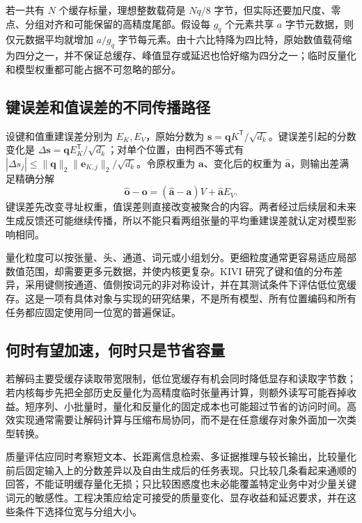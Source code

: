 \documentclass[UTF8,12pt,a4paper,fontset=fandol]{ctexart}
\begin{document}
若一共有 $N$ 个缓存标量，理想整数载荷是 $Nq/8$ 字节，但实际还要加尺度、零点、分组对齐和可能保留的高精度尾部。假设每 $g_q$ 个元素共享 $a$ 字节元数据，则仅元数据平均就增加 $a/g_q$ 字节每元素。由十六比特降为四比特，原始数值载荷缩为四分之一，并不保证总缓存、峰值显存或延迟也恰好缩为四分之一；临时反量化和模型权重都可能占据不可忽略的部分。

\subsection{键误差和值误差的不同传播路径}

设键和值重建误差分别为 $E_K,E_V$，原始分数为 $\mathbf s=\mathbf qK^{\mathsf T}/\sqrt{d_k}$。键误差引起的分数变化是 $\Delta\mathbf s=\mathbf qE_K^{\mathsf T}/\sqrt{d_k}$；对单个位置，由柯西不等式有 $|\Delta s_j|\leq\|\mathbf q\|_2\|\mathbf e_{K,j}\|_2/\sqrt{d_k}$。令原权重为 $\mathbf a$、变化后的权重为 $\widehat{\mathbf a}$，则输出差满足精确分解
\begin{equation}
 \widehat{\mathbf o}-\mathbf o
 =(\widehat{\mathbf a}-\mathbf a)V
 +\widehat{\mathbf a}E_V.
 \label{eq:kv-quant-error}
\end{equation}
键误差先改变寻址权重，值误差则直接改变被聚合的内容。两者经过后续层和未来生成反馈还可能继续传播，所以不能只看两组张量的平均重建误差就认定对模型影响相同。

量化粒度可以按张量、头、通道、词元或小组划分。更细粒度通常更容易适应局部数值范围，却需要更多元数据，并使内核更复杂。KIVI 研究了键和值的分布差异，采用键侧按通道、值侧按词元的非对称设计，并在其测试条件下评估低位宽缓存\cite{kivi}。这是一项有具体对象与实现的研究结果，不是所有模型、所有位置编码和所有任务都应固定使用同一位宽的普遍保证。

\subsection{何时有望加速，何时只是节省容量}

若解码主要受缓存读取带宽限制，低位宽缓存有机会同时降低显存和读取字节数；若内核每步先把全部历史反量化为高精度临时张量再计算，则额外读写可能吞掉收益。短序列、小批量时，量化和反量化的固定成本也可能超过节省的访问时间。高效实现通常需要让解码计算与压缩布局协同，而不是在任意缓存对象外面加一次类型转换。

质量评估应同时考察短文本、长距离信息检索、多证据推理与较长输出，比较量化前后固定输入上的分数差异以及自由生成后的任务表现。只比较几条看起来通顺的回答，不能证明缓存量化无损；只比较困惑度也未必能覆盖特定业务中对少量关键词元的敏感性。工程决策应给定可接受的质量变化、显存收益和延迟要求，并在这些条件下选择位宽与分组大小。
\end{document}
